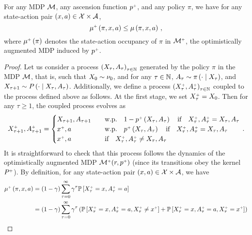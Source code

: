 \begin{lemma} \label{lem:mass-reduced}
  For any MDP $\mathcal{M}$, any ascension function $p^{\mathsf{\scriptscriptstyle +}}$, and any policy $\pi$, we have for any state-action pair $\left( x, a \right) \in \mathcal{X} \times \mathcal{A}$,
  \begin{equation*}
    \mu^{\mathsf{\scriptscriptstyle +}} \left( \pi, x, a \right) \leq \mu \left( \pi, x, a \right)\,,
  \end{equation*}
  where $\mu^{\mathsf{\scriptscriptstyle +}} \left( \pi \right)$ denotes the state-action occupancy of $\pi$ in $\mathcal{M}^{\mathsf{\scriptscriptstyle +}}$, the optimistically augmented MDP induced by $p^{\mathsf{\scriptscriptstyle +}}$.
\end{lemma}

\begin{proof}
  Let us consider a process  $\left( X_\tau, A_\tau \right)_{\tau \in \mathbb{N}}$ generated by the policy $\pi$ in the MDP $\mathcal{M}$, that is, such that $X_0 \sim \nu_0$, and for any $\tau \in \mathbb{N}$, $A_\tau \sim \pi \left( \cdot \mathrel{}\middle|\mathrel{} X_\tau \right)$, and $X_{\tau+1} \sim P \left( \cdot \mathrel{}\middle|\mathrel{} X_\tau, A_\tau \right)$. Additionally, we define a process $\left( X_\tau^{\mathsf{\scriptscriptstyle +}}, A_\tau^{\mathsf{\scriptscriptstyle +}} \right)_{\tau \in \mathbb{N}}$ coupled to the process defined above as follows. At the first stage, we set $X_\tau^{\mathsf{\scriptscriptstyle +}} = X_0$. Then for any $\tau \geq 1$, the coupled process evolves as
  \begin{equation*}
    X_{\tau+1}^{\mathsf{\scriptscriptstyle +}}, A_{\tau+1}^{\mathsf{\scriptscriptstyle +}} =
    \begin{cases}
        X_{\tau+1}, A_{\tau+1} \quad &\text{w.p.} \quad 1 - p^{\mathsf{\scriptscriptstyle +}} \left( X_\tau, A_\tau \right) \quad \text{if} \quad  X_\tau^{\mathsf{\scriptscriptstyle +}}, A_\tau^{\mathsf{\scriptscriptstyle +}} = X_\tau, A_\tau \\
        x^{\mathsf{\scriptscriptstyle +}}, a \quad & \text{w.p.} \quad p^{\mathsf{\scriptscriptstyle +}} \left( X_\tau, A_\tau \right) \quad \text{if} \quad  X_\tau^{\mathsf{\scriptscriptstyle +}}, A_\tau^{\mathsf{\scriptscriptstyle +}} = X_\tau, A_\tau \\
        x^{\mathsf{\scriptscriptstyle +}}, a \quad & \text{if} \quad X_\tau^{\mathsf{\scriptscriptstyle +}}, A_\tau^{\mathsf{\scriptscriptstyle +}} \neq X_\tau, A_\tau
    \end{cases}\,.
  \end{equation*}
  It is straightforward to check that this process follows the dynamics of the optimistically augmented MDP $\mathcal{M}^{\mathsf{\scriptscriptstyle +}}(r,p^{\mathsf{\scriptscriptstyle +}})$ (since its transitions obey the kernel $P^{\mathsf{\scriptscriptstyle +}}$). By definition, for any state-action pair $\left( x, a \right) \in \mathcal{X} \times \mathcal{A}$, we have
  \begin{align*}
    \mu^\upplus \spr{\pi, x, a} &= \spr{1 - \gamma} \sum_{\tau=0}^\infty \gamma^\tau \bbP \sbr{X_\tau^\upplus = x, A_\tau^\upplus = a} \\
    &= \spr{1 - \gamma} \sum_{\tau=0}^\infty \gamma^\tau \spr{\bbP \sbr{X_\tau^\upplus = x, A_\tau^\upplus = a, X_\tau^\upplus \neq x^\upplus} + \bbP \sbr{X_\tau^\upplus = x, A_\tau^\upplus = a, X_\tau^\upplus = x^\upplus}} \\

\end{align*}
\end{proof}
